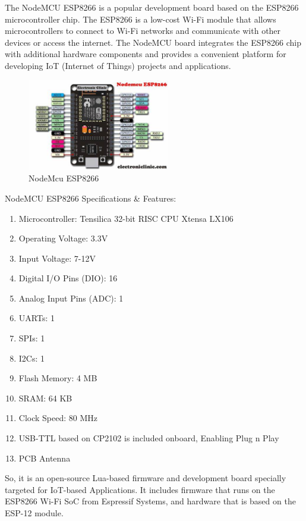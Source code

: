 \documentclass[conference]{IEEEtran}
\begin{document}
The NodeMCU ESP8266 is a popular development board based on the ESP8266 microcontroller chip. The ESP8266 is a low-cost Wi-Fi module that allows microcontrollers to connect to Wi-Fi networks and communicate with other devices or access the internet. The NodeMCU board integrates the ESP8266 chip with additional hardware components and provides a convenient platform for developing IoT (Internet of Things) projects and applications.
\begin{figure}[th]
    \centering
    \includegraphics[height=4cm,width=\linewidth]{images/NODEMCU-ESP8266.jpg}
    \caption{NodeMcu ESP8266}
    \label{fig:enter-label}
\end{figure}

NodeMCU ESP8266 Specifications & Features:
\begin{enumerate}
    \item Microcontroller: Tensilica 32-bit RISC CPU Xtensa LX106
    \item Operating Voltage: 3.3V
    \item Input Voltage: 7-12V
    \item Digital I/O Pins (DIO): 16
    \item Analog Input Pins (ADC): 1
    \item UARTs: 1
    \item SPIs: 1
    \item I2Cs: 1
    \item Flash Memory: 4 MB
    \item SRAM: 64 KB
    \item Clock Speed: 80 MHz
    \item USB-TTL based on CP2102 is included onboard, Enabling Plug n Play
    \item PCB Antenna   
\end{enumerate}


So, it is an open-source Lua-based firmware and development board specially targeted for IoT-based Applications. It includes firmware that runs on the ESP8266 Wi-Fi SoC from Espressif Systems, and hardware that is based on the ESP-12 module.
\end{document}
